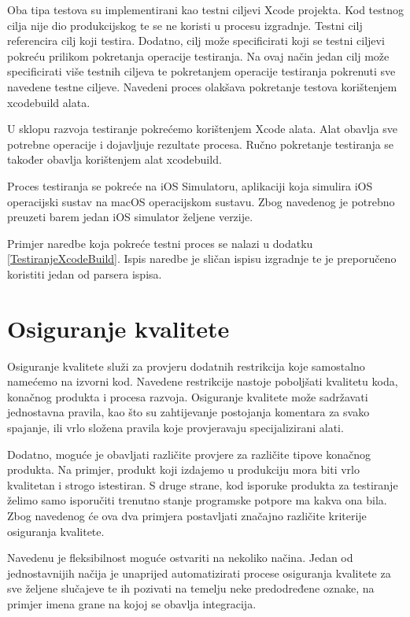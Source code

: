 \documentclass[times, utf8, diplomski, numeric]{fer}
\begin{document}
Oba tipa testova su implementirani kao testni ciljevi Xcode projekta. Kod testnog cilja nije dio produkcijskog te se ne koristi u procesu izgradnje. Testni cilj referencira cilj koji testira. Dodatno, cilj može specificirati koji se testni ciljevi pokreću prilikom pokretanja operacije testiranja. Na ovaj način jedan cilj može specificirati više testnih ciljeva te pokretanjem operacije testiranja pokrenuti sve navedene testne ciljeve. Navedeni proces olakšava pokretanje testova korištenjem xcodebuild alata.

U sklopu razvoja testiranje pokrećemo korištenjem Xcode alata. Alat obavlja sve potrebne operacije i dojavljuje rezultate procesa. Ručno pokretanje testiranja se također obavlja korištenjem alat xcodebuild.

Proces testiranja se pokreće na iOS Simulatoru, aplikaciji koja simulira iOS operacijski sustav na macOS operacijskom sustavu. Zbog navedenog je potrebno preuzeti barem jedan iOS simulator željene verzije.

Primjer naredbe koja pokreće testni proces se nalazi u dodatku \ref{TestiranjeXcodeBuild}. Ispis naredbe je sličan ispisu izgradnje te je preporučeno koristiti jedan od parsera ispisa.


\section{Osiguranje kvalitete}

Osiguranje kvalitete služi za provjeru dodatnih restrikcija koje samostalno namećemo na izvorni kod. Navedene restrikcije nastoje poboljšati kvalitetu koda, konačnog produkta i procesa razvoja. Osiguranje kvalitete može sadržavati jednostavna pravila, kao što su zahtijevanje postojanja komentara za svako spajanje, ili vrlo složena pravila koje provjeravaju specijalizirani alati.

Dodatno, moguće je obavljati različite provjere za različite tipove konačnog produkta. Na primjer, produkt koji izdajemo u produkciju mora biti vrlo kvalitetan i strogo istestiran. S druge strane, kod isporuke produkta za testiranje želimo samo isporučiti trenutno stanje programske potpore ma kakva ona bila. Zbog navedenog će ova dva primjera postavljati značajno različite kriterije osiguranja kvalitete.

Navedenu je fleksibilnost moguće ostvariti na nekoliko načina. Jedan od jednostavnijih načija je unaprijed automatizirati procese osiguranja kvalitete za sve željene slučajeve te ih pozivati na temelju neke predodređene oznake, na primjer imena grane na kojoj se obavlja integracija.
\end{document}
